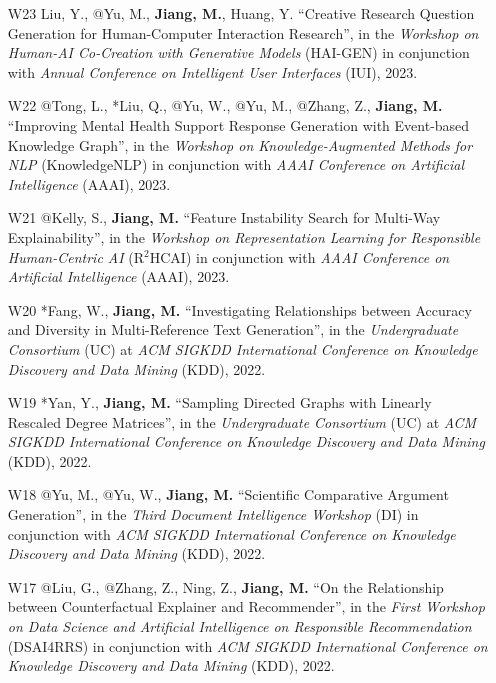 \documentclass[10pt]{article}
\newenvironment{myindentpar}[1]%
{\begin{list}{}%
         {\setlength{\leftmargin}{#1}}%
         \item[]%
}
{\end{list}}
\newcounter{list}
\begin{document}
\begin{myindentpar}{0.00cm}
\begin{enumerate}[leftmargin=.5cm]
\item[W23] Liu, Y., @Yu, M., \textbf{Jiang, M.}, Huang, Y. ``Creative Research Question Generation for Human-Computer Interaction Research'', in the \textit{Workshop on Human-AI Co-Creation with Generative Models} (HAI-GEN) in conjunction with \textit{Annual Conference on Intelligent User Interfaces} (IUI), 2023.

\item[W22] @Tong, L., *Liu, Q., @Yu, W., @Yu, M., @Zhang, Z., \textbf{Jiang, M.} ``Improving Mental Health Support Response Generation with Event-based Knowledge Graph'', in the \textit{Workshop on Knowledge-Augmented Methods for NLP} (KnowledgeNLP) in conjunction with \textit{AAAI Conference on Artificial Intelligence} (AAAI), 2023.

\item[W21] @Kelly, S., \textbf{Jiang, M.} ``Feature Instability Search for Multi-Way Explainability'', in the \textit{Workshop on Representation Learning for Responsible Human-Centric AI} (R$^2$HCAI) in conjunction with \textit{AAAI Conference on Artificial Intelligence} (AAAI), 2023.

\item[W20] *Fang, W., \textbf{Jiang, M.} ``Investigating Relationships between Accuracy and Diversity in Multi-Reference Text Generation'', in the \textit{Undergraduate Consortium} (UC) at \textit{ACM SIGKDD International Conference on Knowledge Discovery and Data Mining} (KDD), 2022.

\item[W19] *Yan, Y., \textbf{Jiang, M.} ``Sampling Directed Graphs with Linearly Rescaled Degree Matrices'', in the \textit{Undergraduate Consortium} (UC) at \textit{ACM SIGKDD International Conference on Knowledge Discovery and Data Mining} (KDD), 2022.

\item[W18] @Yu, M., @Yu, W., \textbf{Jiang, M.} ``Scientific Comparative Argument Generation'', in the \textit{Third Document Intelligence Workshop} (DI) in conjunction with \textit{ACM SIGKDD International Conference on Knowledge Discovery and Data Mining} (KDD), 2022.

\item[W17] @Liu, G., @Zhang, Z., Ning, Z., \textbf{Jiang, M.} ``On the Relationship between Counterfactual Explainer and Recommender'', in the \textit{First Workshop on Data Science and Artificial Intelligence on Responsible Recommendation} (DSAI4RRS) in conjunction with \textit{ACM SIGKDD International Conference on Knowledge Discovery and Data Mining} (KDD), 2022.


\end{enumerate}
\end{myindentpar}
\end{document}
